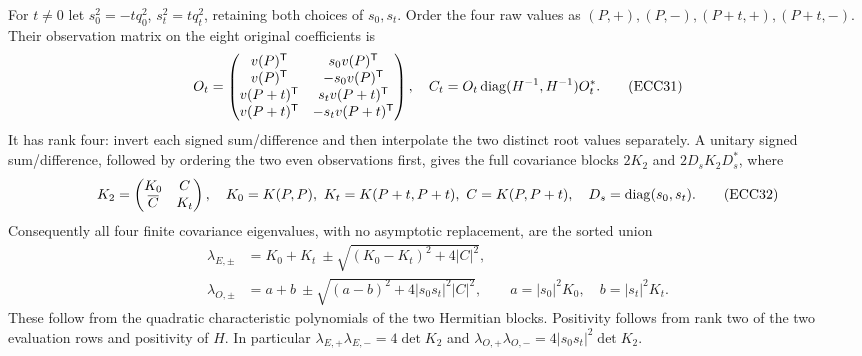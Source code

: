 \documentclass[11pt]{article}
\begin{document}
For $t\ne0$ let $s_0^2=-tq_0^2$, $s_t^2=tq_t^2$, retaining both choices
of $s_0,s_t$. Order the four raw values as $(P,+),(P,-),(P+t,+),(P+t,-)$.
Their observation matrix on the eight original coefficients is
\begin{equation}
 O_t=\begin{pmatrix}
 v(P)^{\mathsf T}&s_0v(P)^{\mathsf T}\\
 v(P)^{\mathsf T}&-s_0v(P)^{\mathsf T}\\
 v(P+t)^{\mathsf T}&s_tv(P+t)^{\mathsf T}\\
 v(P+t)^{\mathsf T}&-s_tv(P+t)^{\mathsf T}
 \end{pmatrix},\quad
 C_t=O_t\operatorname{diag}(H^{-1},H^{-1})O_t^*.
 \tag{ECC31}
\end{equation}
It has rank four: invert each signed sum/difference and then interpolate
the two distinct root values separately. A unitary signed sum/difference,
followed by ordering the two even observations first, gives the full
covariance blocks $2K_2$ and $2D_sK_2D_s^*$, where
\begin{equation}
 K_2=\begin{pmatrix}K_0&C\\\overline C&K_t\end{pmatrix},\quad
 K_0=K(P,P),\ K_t=K(P+t,P+t),\ C=K(P,P+t),\quad
 D_s=\operatorname{diag}(s_0,s_t).
 \tag{ECC32}
\end{equation}
Consequently all four finite covariance eigenvalues, with no asymptotic
replacement, are the sorted union
\begin{equation}
 \begin{aligned}
 \lambda_{E,\pm}&=K_0+K_t\ \pm\sqrt{(K_0-K_t)^2+4|C|^2},\\
 \lambda_{O,\pm}&=a+b\ \pm\sqrt{(a-b)^2+4|s_0s_t|^2|C|^2},\qquad
 a=|s_0|^2K_0,\quad b=|s_t|^2K_t.
 \end{aligned}\tag{ECC33}
\end{equation}
These follow from the quadratic characteristic polynomials of the two
Hermitian blocks. Positivity follows from rank two of the two evaluation
rows and positivity of $H$. In particular
$\lambda_{E,+}\lambda_{E,-}=4\det K_2$ and
$\lambda_{O,+}\lambda_{O,-}=4|s_0s_t|^2\det K_2$.
\end{document}
